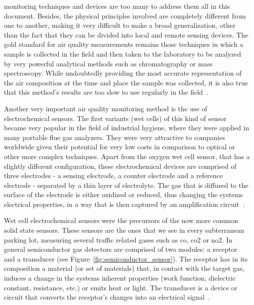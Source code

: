  monitoring techniques and devices are too many to address
them all in this document. Besides, the physical principles involved are
completely different from one to another, making it very difficult to
make a broad generalization, other than the fact that they can be
divided into local and remote sensing devices. The gold standard for air
quality measurements remains those techniques in which a sample is
collected in the field and then taken to the laboratory to be analyzed
by very powerful analytical methods such as chromatography or mass
spectroscopy. While undoubtedly providing the most accurate
representation of the air composition at the time and place the sample
was collected, it is also true that this method's results are too slow
to use regularly in the field~\cite{Vallero2014, Clark1997, Bishop1996}.

Another very important air quality monitoring method is the use of
electrochemical sensors. The first variants (wet cells) of this kind of
sensor became very popular in the field of industrial hygiene, where
they were applied in many portable flue gas analyzers. They were very
attractive to companies worldwide given their potential for very low
costs in comparison to optical or other more complex techniques. Apart
from the oxygen wet cell sensor, that has a slightly different
configuration, these electrochemical devices are comprised of three
electrodes - a sensing electrode, a counter electrode and a reference
electrode - separated by a thin layer of electrolyte. The gas that is
diffused to the surface of the electrode is either oxidized or reduced,
thus changing the systems electrical properties, in a way that is then
captured by an amplification circuit~\cite{Clark1997}.

Wet cell electrochemical sensors were the precursors of the now more
common solid state sensors. These sensors are the ones that we see in
every subterranean parking lot, measuring several traffic related gases
such as \gls{co}, \gls{co2} or \gls{no2}. In general semiconductor gas
detectors are comprised of two modules: a receptor and a transducer (see
Figure~\ref{fig:semiconductor_sensor}). The receptor has in its
composition a material (or set of materials) that, in contact with the
target gas, induces a change in the systems inherent properties (work
function, dielectric constant, resistance, etc.) or emits heat or light.
The transducer is a device or circuit that converts the receptor's
changes into an electrical signal~\cite{Clark1997, Bishop1996,
Vallero2014}.

